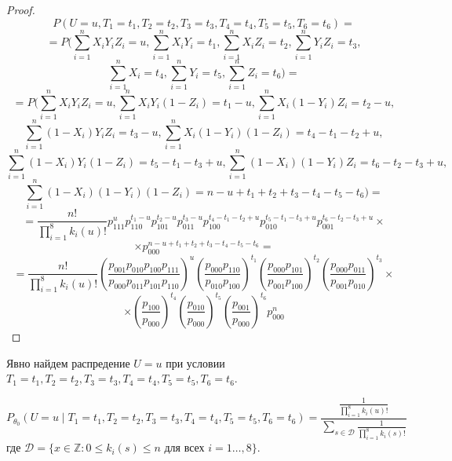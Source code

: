     \begin{proof}
        $$
            P(U=u, T_1=t_1, T_2=t_2, T_3=t_3, T_4=t_4, T_5=t_5, T_6=t_6)=
        $$
        $$
            =P\biggl(\sum_{i=1}^n X_i Y_i Z_i=u, \sum_{i=1}^n X_i Y_i=t_1, \sum_{i=1}^n X_i Z_i=t_2,\sum_{i=1}^n Y_i Z_i=t_3,
            $$
            $$
            \sum_{i=1}^n X_i=t_4,\sum_{i=1}^n Y_i=t_5, \sum_{i=1}^n Z_i=t_6\biggr)=
        $$
        $$
            =P\biggl(\sum_{i=1}^n X_i Y_i Z_i=u, \sum_{i=1}^n X_i Y_i (1- Z_i)=t_1-u, \sum_{i=1}^n X_i (1-Y_i) Z_i=t_2-u,
        $$
        $$
            \sum_{i=1}^n (1-X_i) Y_i Z_i=t_3-u,
            \sum_{i=1}^{n} X_i(1-Y_i)(1-Z_i)=t_4-t_1-t_2+u,
        $$
        $$
            \sum_{i=1}^{n} (1-X_i)Y_i(1-Z_i)=t_5-t_1-t_3+u,
            \sum_{i=1}^{n} (1-X_i)(1-Y_i)Z_i = t_6 - t_2 - t_3 + u,
        $$
        $$
            \sum_{i=1}^n (1-X_i)(1-Y_i)(1-Z_i)=n-u+t_1+t_2+t_3-t_4-t_5-t_6\biggr)=
        $$
        $$
            = \frac{n!}{\prod_{i=1}^8 k_i(u)!} p_{111}^u p_{110}^{t_1-u} p_{101}^{t_2-u} p_{011}^{t_3-u}
            p_{100}^{t_4-t_1-t_2+u} p_{010}^{t_5-t_1-t_3+u} p_{001}^{t_6 - t_2 - t_3 + u} \times
        $$
        $$
            \times p_{000}^{n-u+t_1+t_2+t_3-t_4-t_5-t_6}
            =
        $$
        $$=\frac{n!}{\prod_{i=1}^8 k_i(u)!} \left(\dfrac{p_{001}p_{010}p_{100}p_{111}}{p_{000}p_{011}p_{101}p_{110}}\right)^u
            \left(\dfrac{p_{000} p_{110}}{p_{010} p_{100}}\right)^{t_1}\left(\dfrac{p_{000}p_{101}}{p_{001}p_{100}}\right)^{t_2}
            \left(\dfrac{p_{000}p_{011}}{p_{001}p_{010}}\right)^{t_3} \times$$
        $$
            \times\left(\dfrac{p_{100}}{p_{000}}\right)^{t_4}
            \left(\dfrac{p_{010}}{p_{000}}\right)^{t_5} \left(\dfrac{p_{001}}{p_{000}}\right)^{t_6} p_{000}^n
        $$
    \end{proof}
    Явно найдем распредение $U=u$ при условии $T_1=t_1, T_2=t_2, T_3=t_3, T_4=t_4, T_5=t_5, T_6=t_6$.
    \begin{lemma}\label{u_dist}
        $$P_{\theta_0}(U=u \mid T_1=t_1, T_2=t_2, T_3=t_3, T_4=t_4, T_5=t_5, T_6=t_6)=\dfrac{\frac{1}{\prod_{i=1}^8 k_i(u)!}}
            {\sum_{s\in \mathcal{D}} \frac{1}{\prod_{i=1}^8 k_i(s)!}}$$
        где $\mathcal{D}=\{x \in \mathbb{Z}: 0\leq k_i(s) \leq n \text{ для всех } i=1\ldots,8\}$.
    \end{lemma}

